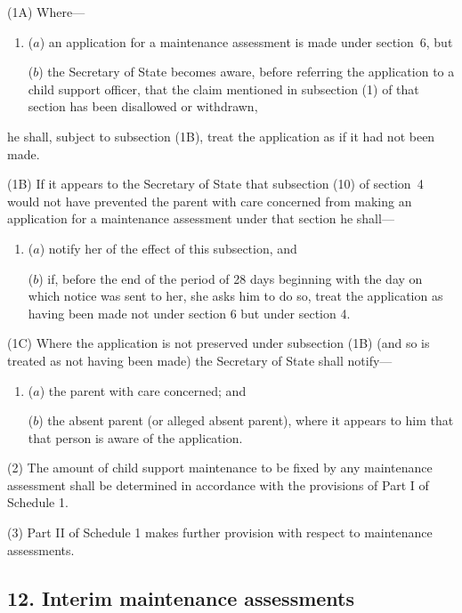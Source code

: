 \documentclass[12pt,a4paper]{article}
\begin{document}
(1A) Where—
\begin{enumerate}\item[]
($a$) an application for a maintenance assessment is made under section~6, but

($b$) the Secretary of State becomes aware, before referring the application to a child support officer, that the claim mentioned in subsection (1) of that section has been disallowed or withdrawn,
\end{enumerate}
he shall, subject to subsection (1B), treat the application as if it had not been made.

(1B) If it appears to the Secretary of State that subsection (10) of section~4 would not have prevented the parent with care concerned from making an application for a maintenance assessment under that section he shall—
\begin{enumerate}\item[]
($a$) notify her of the effect of this subsection, and

($b$) if, before the end of the period of 28 days beginning with the day on which notice was sent to her, she asks him to do so, treat the application as having been made not under section 6 but under section 4.
\end{enumerate}

(1C) Where the application is not preserved under subsection (1B) (and so is treated as not having been made) the Secretary of State shall notify—
\begin{enumerate}\item[]
($a$) the parent with care concerned; and

($b$) the absent parent (or alleged absent parent), where it appears to him that that person is aware of the application.
\end{enumerate}

(2) The amount of child support maintenance to be fixed by any maintenance assessment shall be determined in accordance with the provisions of Part I of Schedule 1.

(3) Part II of Schedule 1 makes further provision with respect to maintenance assessments.


\subsection{12. Interim maintenance assessments}
\end{document}
